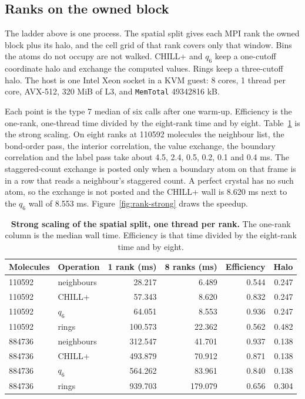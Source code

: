 \documentclass[preprint,12pt]{elsarticle}
\begin{document}
\subsection{Ranks on the owned block}
\label{sec:rank-grid}

The ladder above is one process. The spatial split gives each MPI rank the owned block plus its halo, and the cell grid of that rank covers only that window. Bins the atoms do not occupy are not walked. CHILL+ and $q_6$ keep a one-cutoff coordinate halo and exchange the computed values. Rings keep a three-cutoff halo. The host is one Intel Xeon socket in a KVM guest: 8 cores, 1 thread per core, AVX-512, 320 MiB of L3, and \texttt{MemTotal} 49342816 kB.

Each point is the type 7 median of six calls after one warm-up. Efficiency is the one-rank, one-thread time divided by the eight-rank time and by eight. Table~\ref{tab:rank-strong} is the strong scaling. On eight ranks at 110592 molecules the neighbour list, the bond-order pass, the interior correlation, the value exchange, the boundary correlation and the label pass take about 4.5, 2.4, 0.5, 0.2, 0.1 and 0.4 ms. The staggered-count exchange is posted only when a boundary atom on that frame is in a row that reads a neighbour's staggered count. A perfect crystal has no such atom, so the exchange is not posted and the CHILL+ wall is 8.620 ms next to the $q_6$ wall of 8.553 ms. Figure~\ref{fig:rank-strong} draws the speedup.

\begin{table}[tbp]
\centering
\caption{\textbf{Strong scaling of the spatial split, one thread per rank.}
The one-rank column is the median wall time. Efficiency is that time divided by the eight-rank time and by eight.}
\label{tab:rank-strong}
\begin{tabular}{llrrrr}
\toprule
Molecules & Operation & 1 rank (\unit{\ms}) & 8 ranks (\unit{\ms}) & Efficiency & Halo \\
\midrule
110592 & neighbours & 28.217 & 6.489 & 0.544 & 0.247 \\
110592 & CHILL+ & 57.343 & 8.620 & 0.832 & 0.247 \\
110592 & $q_6$ & 64.051 & 8.553 & 0.936 & 0.247 \\
110592 & rings & 100.573 & 22.362 & 0.562 & 0.482 \\
884736 & neighbours & 312.547 & 41.701 & 0.937 & 0.138 \\
884736 & CHILL+ & 493.879 & 70.912 & 0.871 & 0.138 \\
884736 & $q_6$ & 564.262 & 83.961 & 0.840 & 0.138 \\
884736 & rings & 939.703 & 179.079 & 0.656 & 0.304 \\
\bottomrule
\end{tabular}
\end{table}
\end{document}
